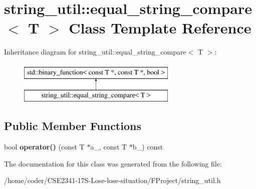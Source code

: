 \section{string\+\_\+util\+:\+:equal\+\_\+string\+\_\+compare$<$ T $>$ Class Template Reference}
\label{classstring__util_1_1equal__string__compare}
Inheritance diagram for string\+\_\+util\+:\+:equal\+\_\+string\+\_\+compare$<$ T $>$\+:\begin{figure}[H]
\begin{center}
\leavevmode
\includegraphics[height=2.000000cm]{classstring__util_1_1equal__string__compare}
\end{center}
\end{figure}
\subsection*{Public Member Functions}
\begin{DoxyCompactItemize}
\item 
bool {\bfseries operator()} (const T $\ast$a\+\_\+, const T $\ast$b\+\_\+) const \label{classstring__util_1_1equal__string__compare_aedfb40c0515b97043369af03da1d72ed}

\end{DoxyCompactItemize}


The documentation for this class was generated from the following file\+:\begin{DoxyCompactItemize}
\item 
/home/coder/\+C\+S\+E2341-\/17\+S-\/\+Lose-\/lose-\/situation/\+F\+Project/string\+\_\+util.\+h\end{DoxyCompactItemize}
